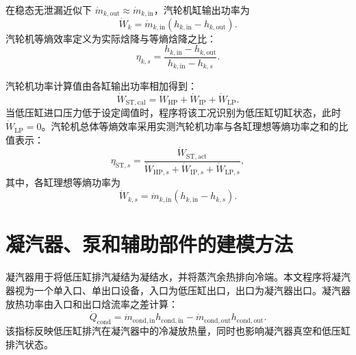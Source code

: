 在稳态无泄漏近似下 $\dot{m}_{k,\mathrm{out}}\approx \dot{m}_{k,\mathrm{in}}$，汽轮机缸输出功率为
\begin{equation}\label{eq:st-cylinder-power}
\dot{W}_{k}
=
\dot{m}_{k,\mathrm{in}}
\left(
h_{k,\mathrm{in}}
-
h_{k,\mathrm{out}}
\right).
\end{equation}
汽轮机等熵效率定义为实际焓降与等熵焓降之比：
\begin{equation}\label{eq:st-isentropic-eff}
\eta_{k,s}
=
\frac{
h_{k,\mathrm{in}}-h_{k,\mathrm{out}}
}{
h_{k,\mathrm{in}}-h_{k,s}
}.
\end{equation}

汽轮机功率计算值由各缸输出功率相加得到：
\begin{equation}\label{eq:st-total-power}
\dot{W}_{\mathrm{ST,cal}}
=
\dot{W}_{\mathrm{HP}}
+
\dot{W}_{\mathrm{IP}}
+
\dot{W}_{\mathrm{LP}}.
\end{equation}
当低压缸进口压力低于设定阈值时，程序将该工况识别为低压缸切缸状态，此时 $\dot{W}_{\mathrm{LP}}=0$。汽轮机总体等熵效率采用实测汽轮机功率与各缸理想等熵功率之和的比值表示：
\begin{equation}\label{eq:st-overall-eff}
\eta_{\mathrm{ST},s}
=
\frac{
\dot{W}_{\mathrm{ST,act}}
}{
\dot{W}_{\mathrm{HP},s}
+
\dot{W}_{\mathrm{IP},s}
+
\dot{W}_{\mathrm{LP},s}
},
\end{equation}
其中，各缸理想等熵功率为
\begin{equation}\label{eq:st-isentropic-power}
\dot{W}_{k,s}
=
\dot{m}_{k,\mathrm{in}}
\left(
h_{k,\mathrm{in}}
-
h_{k,s}
\right).
\end{equation}

\section{凝汽器、泵和辅助部件的建模方法}

凝汽器用于将低压缸排汽凝结为凝结水，并将蒸汽余热排向冷端。本文程序将凝汽器视为一个单入口、单出口设备，入口为低压缸出口，出口为凝汽器出口。凝汽器放热功率由入口和出口焓流率之差计算：
\begin{equation}\label{eq:condenser-heat}
\dot{Q}_{\mathrm{cond}}
=
\dot{m}_{\mathrm{cond,in}}h_{\mathrm{cond,in}}
-
\dot{m}_{\mathrm{cond,out}}h_{\mathrm{cond,out}}.
\end{equation}
该指标反映低压缸排汽在凝汽器中的冷凝放热量，同时也影响凝汽器真空和低压缸排汽状态。

